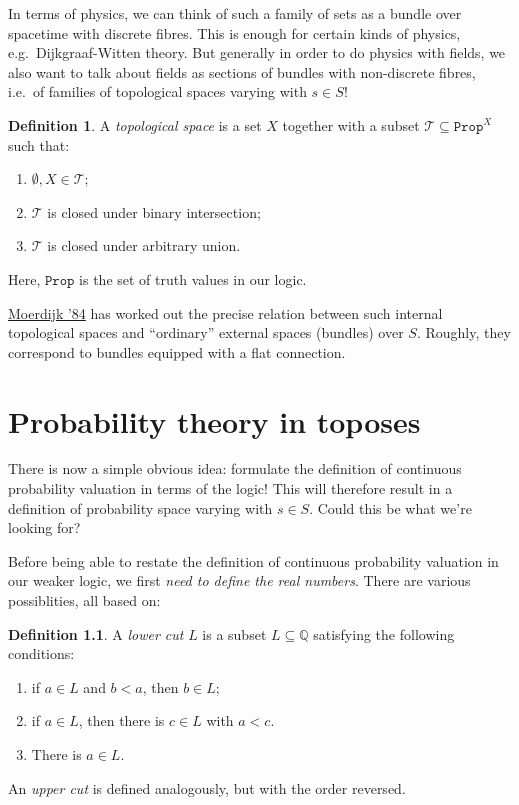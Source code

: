 \documentclass[11pt, oneside, article]{memoir}
\theoremstyle{plain}
\theoremstyle{definition}
\newtheorem{definition}[theorem]{Definition}
\theoremstyle{remark}
\newcommand{\const}[1]{\mathtt{#1}}
\newcommand{\Prop}{\const{Prop}}
\begin{document}
In terms of physics, we can think of such a family of sets as a bundle over spacetime with discrete fibres. This is enough for certain kinds of physics, e.g.~Dijkgraaf-Witten theory. But generally in order to do physics with fields, we also want to talk about fields as sections of bundles with non-discrete fibres, i.e.~of families of topological spaces varying with $s \in S$!

\begin{definition}
A \emph{topological space} is a set $X$ together with a subset $\mathcal{T} \subseteq \Prop^X$ such that:
\begin{enumerate}
\item $\emptyset,X\in\mathcal{T}$;
\item $\mathcal{T}$ is closed under binary intersection;
\item $\mathcal{T}$ is closed under arbitrary union.
\end{enumerate}
\end{definition}

Here, $\Prop$ is the set of truth values in our logic.

\href{http://www.numdam.org/item?id=CM_1984__53_2_171_0}{Moerdijk '84} has worked out the precise relation between such internal topological spaces and ``ordinary'' external spaces (bundles) over $S$. Roughly, they correspond to bundles equipped with a flat connection.

\chapter{Probability theory in toposes}

There is now a simple obvious idea: formulate the definition of continuous probability valuation in terms of the logic! This will therefore result in a definition of probability space varying with $s \in S$. Could this be what we're looking for?

Before being able to restate the definition of continuous probability valuation in our weaker logic, we first \emph{need to define the real numbers}. There are various possiblities, all based on:

\newcommand{\Q}{\mathbb{Q}}

\begin{definition}
A \emph{lower cut} $L$ is a subset $L\subseteq\Q$ satisfying the following conditions:
\begin{enumerate}
\item if $a \in L$ and $b < a$, then $b\in L$;
\item if $a \in L$, then there is $c\in L$ with $a < c$.
\item There is $a\in L$.
\end{enumerate}
An \emph{upper cut} is defined analogously, but with the order reversed.
\end{definition}
\end{document}
